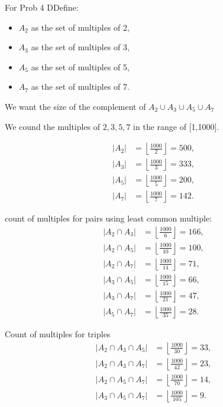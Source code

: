 \documentclass{report}
\begin{document}
\begin{RemarkWithLily}{For Prob 4}
  DDefine:

  \begin{itemize}
      \item \(A_2\) as the set of multiples of 2,
      \item \(A_3\) as the set of multiples of 3,
      \item \(A_5\) as the set of multiples of 5,
      \item \(A_7\) as the set of multiples of 7.
  \end{itemize}
  
  We want the size of the complement of \(A_2 \cup A_3 \cup A_5 \cup A_7\)
  
  We cound the multiples of \(2,3,5,7 \) in the range of [1,1000].

  \[
  \begin{aligned}
  |A_2| &= \left\lfloor \frac{1000}{2} \right\rfloor = 500, \\
  |A_3| &= \left\lfloor \frac{1000}{3} \right\rfloor = 333, \\
  |A_5| &= \left\lfloor \frac{1000}{5} \right\rfloor = 200, \\
  |A_7| &= \left\lfloor \frac{1000}{7} \right\rfloor = 142.
  \end{aligned}
  \]
  
  count of multiples for pairs using least common multiple:
  \[
  \begin{aligned}
  |A_2 \cap A_3| &= \left\lfloor \frac{1000}{6} \right\rfloor = 166, \\
  |A_2 \cap A_5| &= \left\lfloor \frac{1000}{10} \right\rfloor = 100, \\
  |A_2 \cap A_7| &= \left\lfloor \frac{1000}{14} \right\rfloor = 71, \\
  |A_3 \cap A_5| &= \left\lfloor \frac{1000}{15} \right\rfloor = 66, \\
  |A_3 \cap A_7| &= \left\lfloor \frac{1000}{21} \right\rfloor = 47, \\
  |A_5 \cap A_7| &= \left\lfloor \frac{1000}{35} \right\rfloor = 28.
  \end{aligned}
  \]
  
  Count of multiples for triples
  \[
  \begin{aligned}
  |A_2 \cap A_3 \cap A_5| &= \left\lfloor \frac{1000}{30} \right\rfloor = 33, \\
  |A_2 \cap A_3 \cap A_7| &= \left\lfloor \frac{1000}{42} \right\rfloor = 23, \\
  |A_2 \cap A_5 \cap A_7| &= \left\lfloor \frac{1000}{70} \right\rfloor = 14, \\
  |A_3 \cap A_5 \cap A_7| &= \left\lfloor \frac{1000}{105} \right\rfloor = 9.
  \end{aligned}
  \]
  

\end{RemarkWithLily}
\end{document}
